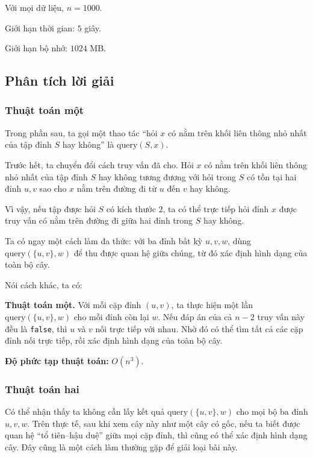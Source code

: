 \documentclass[11pt]{article}
\begin{document}
Với mọi dữ liệu, \(n=1000\).

Giới hạn thời gian: \(5\) giây.

Giới hạn bộ nhớ: \(1024\) MB.

\subsection{Phân tích lời giải}

\subsubsection{Thuật toán một}

Trong phần sau, ta gọi một thao tác ``hỏi \(x\) có nằm trên khối liên thông nhỏ
nhất của tập đỉnh \(S\) hay không'' là \(\mathrm{query}(S,x)\).

Trước hết, ta chuyển đổi cách truy vấn đã cho. Hỏi \(x\) có nằm trên khối liên
thông nhỏ nhất của tập đỉnh \(S\) hay không tương đương với hỏi trong \(S\) có
tồn tại hai đỉnh \(u,v\) sao cho \(x\) nằm trên đường đi từ \(u\) đến \(v\) hay
không.

Vì vậy, nếu tập được hỏi \(S\) có kích thước \(2\), ta có thể trực tiếp hỏi đỉnh
\(x\) được truy vấn có nằm trên đường đi giữa hai đỉnh trong \(S\) hay không.

Ta có ngay một cách làm đa thức: với ba đỉnh bất kỳ \(u,v,w\), dùng
\(\mathrm{query}(\{u,v\},w)\) để thu được quan hệ giữa chúng, từ đó xác định
hình dạng của toàn bộ cây.

Nói cách khác, ta có:

\textbf{Thuật toán một.} Với mỗi cặp đỉnh \((u,v)\), ta thực hiện một lần
\(\mathrm{query}(\{u,v\},w)\) cho mỗi đỉnh còn lại \(w\). Nếu đáp án của cả
\(n-2\) truy vấn này đều là \texttt{false}, thì \(u\) và \(v\) nối trực tiếp với
nhau. Nhờ đó có thể tìm tất cả các cặp đỉnh nối trực tiếp, rồi xác định hình
dạng của toàn bộ cây.

\textbf{Độ phức tạp thuật toán:} \(O(n^3)\).

\subsubsection{Thuật toán hai}

Có thể nhận thấy ta không cần lấy kết quả
\(\mathrm{query}(\{u,v\},w)\) cho mọi bộ ba đỉnh \(u,v,w\). Trên thực tế, sau khi
xem cây này như một cây có gốc, nếu ta biết được quan hệ ``tổ tiên--hậu duệ''
giữa mọi cặp đỉnh, thì cũng có thể xác định hình dạng cây. Đây cũng là một cách
làm thường gặp để giải loại bài này.
\end{document}
